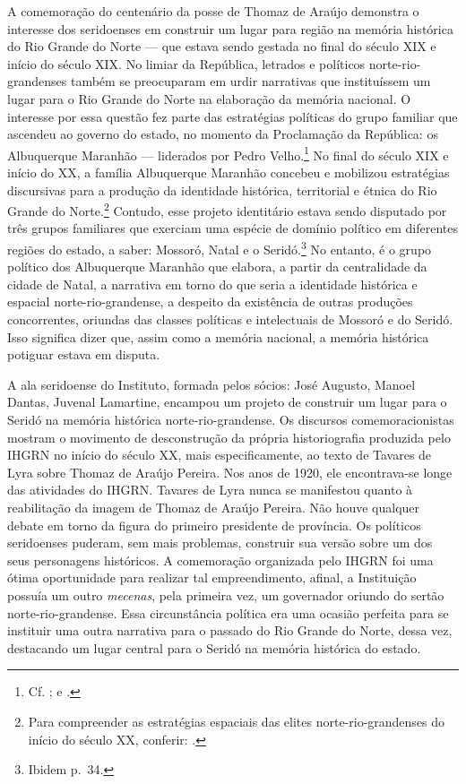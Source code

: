 \begin{refsection}
    A comemoração do centenário da posse de Thomaz de Araújo demonstra o interesse dos seridoenses em construir um lugar para região na memória histórica do Rio Grande do Norte --- que estava sendo gestada no final do século XIX e início do século XIX. No limiar da República, letrados e políticos norte-rio-grandenses também se preocuparam em urdir narrativas que instituíssem um lugar para o Rio Grande do Norte na elaboração da memória nacional. O interesse por essa questão fez parte das estratégias políticas do grupo familiar que ascendeu ao governo do estado, no momento da Proclamação da República: os Albuquerque Maranhão --- liderados por Pedro Velho.\footnote{Cf. ; e .} No final do século XIX e início do XX, a família Albuquerque Maranhão concebeu e mobilizou estratégias discursivas para a produção da identidade histórica, territorial e étnica do Rio Grande do Norte.\footnote{Para compreender as estratégias espaciais das elites norte-rio-grandenses do início do século XX, conferir: .} Contudo, esse projeto identitário estava sendo disputado por três grupos familiares que exerciam uma espécie de domínio político em diferentes regiões do estado, a saber: Mossoró, Natal e o Seridó.\footnote{Ibidem p.~34.} No entanto, é o grupo político dos Albuquerque Maranhão que elabora, a partir da centralidade da cidade de Natal, a narrativa em torno do que seria a identidade histórica e espacial norte-rio-grandense, a despeito da existência de outras produções concorrentes, oriundas das classes políticas e intelectuais de Mossoró e do Seridó. Isso significa dizer que, assim como a memória nacional, a memória histórica potiguar estava em disputa.   

    A ala seridoense do Instituto, formada pelos sócios: José Augusto, Manoel Dantas, Juvenal Lamartine, encampou um projeto de construir um lugar para o Seridó na memória histórica norte-rio-grandense. Os discursos comemoracionistas mostram o movimento de desconstrução da própria historiografia produzida pelo IHGRN no início do século XX, mais especificamente, ao texto de Tavares de Lyra sobre Thomaz de Araújo Pereira. Nos anos de 1920, ele encontrava-se longe das atividades do IHGRN. Tavares de Lyra nunca se manifestou quanto à reabilitação da imagem de Thomaz de Araújo Pereira. Não houve qualquer debate em torno da figura do primeiro presidente de província. Os políticos seridoenses puderam, sem mais problemas, construir sua versão sobre um dos seus personagens históricos. A comemoração organizada pelo IHGRN foi uma ótima oportunidade para realizar tal empreendimento, afinal, a Instituição possuía um outro \textit{mecenas}, pela primeira vez, um governador oriundo do sertão norte-rio-grandense. Essa circunstância política era uma ocasião perfeita para se instituir uma outra narrativa para o passado do Rio Grande do Norte, dessa vez, destacando um lugar central para o Seridó na memória histórica do estado.


\end{refsection}
